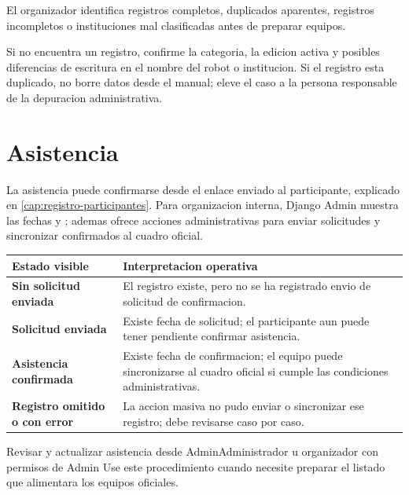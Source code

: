 \begin{resultadoesperado}
El organizador identifica registros completos, duplicados aparentes, registros incompletos o instituciones mal clasificadas antes de preparar equipos.
\end{resultadoesperado}

\begin{fallas}
Si no encuentra un registro, confirme la categoria, la edicion activa y posibles diferencias de escritura en el nombre del robot o institucion. Si el registro esta duplicado, no borre datos desde el manual; eleve el caso a la persona responsable de la depuracion administrativa.
\end{fallas}

\section{Asistencia}

La asistencia puede confirmarse desde el enlace enviado al participante, explicado en \cref{cap:registro-participantes}. Para organizacion interna, Django Admin muestra las fechas  y ; ademas ofrece acciones administrativas para enviar solicitudes y sincronizar confirmados al cuadro oficial.

\begin{tabularx}{\linewidth}{>{\bfseries}p{4cm}X}
\toprule
Estado visible & Interpretacion operativa\\
\midrule
Sin solicitud enviada & El registro existe, pero no se ha registrado envio de solicitud de confirmacion.\\
Solicitud enviada & Existe fecha de solicitud; el participante aun puede tener pendiente confirmar asistencia.\\
Asistencia confirmada & Existe fecha de confirmacion; el equipo puede sincronizarse al cuadro oficial si cumple las condiciones administrativas.\\
Registro omitido o con error & La accion masiva no pudo enviar o sincronizar ese registro; debe revisarse caso por caso.\\
\bottomrule
\end{tabularx}

\begin{procedimiento}{Revisar y actualizar asistencia desde Admin}{Administrador u organizador con permisos de Admin}
Use este procedimiento cuando necesite preparar el listado que alimentara los equipos oficiales.
\end{procedimiento}

